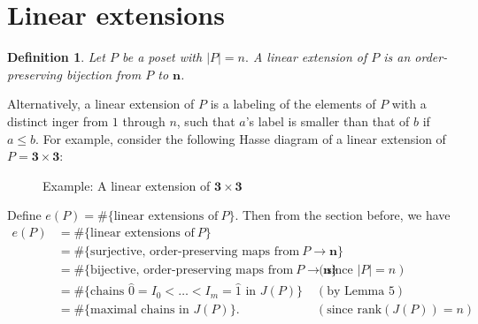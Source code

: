 \documentclass[11pt]{article}
\newtheorem{definition}[theorem]{Definition}
\newcommand{\cn}{\mathbf{n}}
\begin{document}
\clearpage

\section{Linear extensions}

\begin{definition} Let $P$ be a poset with $|P| = n.$ A linear extension of $P$ is an order-preserving bijection from $P$ to $\cn$. \end{definition}

Alternatively, a linear extension of $P$ is a labeling of the elements of $P$ with a distinct inger from $1$ through $n$, such that $a$'s label is smaller than that of $b$ if $a \le b$. For example, consider the following Hasse diagram of a linear extension of $P = \mathbf{3} \times \mathbf{3}$:

\begin{figure}[h]
    \caption{Example: A linear extension of $\mathbf{3} \times \mathbf{3}$}
    \begin{center}
    \end{center}
\end{figure}

Define $e(P) = \#\{\textrm{linear extensions of}\ P\}$. Then from the section before, we have
\begin{align*}
e(P) & = \#\{\textrm{linear extensions of}\ P\} & \\
 & = \#\{\textrm{surjective, order-preserving maps from}\ P \rightarrow \cn\} & \\
 & = \#\{\textrm{bijective, order-preserving maps from}\ P \rightarrow \cn\} & (\textrm{since } |P| = n) \\
 & = \#\{\textrm{chains } \hat{0} = I_0 < \ldots < I_m = \hat{1} \textrm{ in } J(P)\} & (\textrm{by Lemma 5})\\
 & = \#\{\textrm{maximal chains in } J(P)\}. & (\textrm{since rank}(J(P)) = n)
\end{align*}
\end{document}
